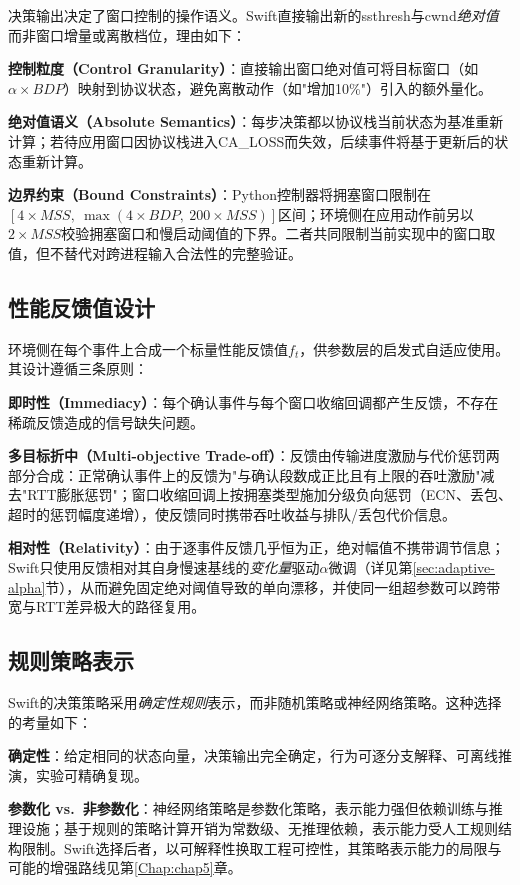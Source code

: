 决策输出决定了窗口控制的操作语义。Swift直接输出新的ssthresh与cwnd\emph{绝对值}而非窗口增量或离散档位，理由如下：

\textbf{控制粒度（Control Granularity）}：直接输出窗口绝对值可将目标窗口（如$\alpha \times BDP$）映射到协议状态，避免离散动作（如"增加10\%"）引入的额外量化。

\textbf{绝对值语义（Absolute Semantics）}：每步决策都以协议栈当前状态为基准重新计算；若待应用窗口因协议栈进入CA\_LOSS而失效，后续事件将基于更新后的状态重新计算。

\textbf{边界约束（Bound Constraints）}：Python控制器将拥塞窗口限制在$[4 \times MSS,\ \max(4 \times BDP,\ 200 \times MSS)]$区间；环境侧在应用动作前另以$2\times MSS$校验拥塞窗口和慢启动阈值的下界。二者共同限制当前实现中的窗口取值，但不替代对跨进程输入合法性的完整验证。

\subsection{性能反馈值设计}

环境侧在每个事件上合成一个标量性能反馈值$f_t$，供参数层的启发式自适应使用。其设计遵循三条原则：

\textbf{即时性（Immediacy）}：每个确认事件与每个窗口收缩回调都产生反馈，不存在稀疏反馈造成的信号缺失问题。

\textbf{多目标折中（Multi-objective Trade-off）}：反馈由传输进度激励与代价惩罚两部分合成：正常确认事件上的反馈为"与确认段数成正比且有上限的吞吐激励"减去"RTT膨胀惩罚"；窗口收缩回调上按拥塞类型施加分级负向惩罚（ECN、丢包、超时的惩罚幅度递增），使反馈同时携带吞吐收益与排队/丢包代价信息。

\textbf{相对性（Relativity）}：由于逐事件反馈几乎恒为正，绝对幅值不携带调节信息；Swift只使用反馈相对其自身慢速基线的\emph{变化量}驱动$\alpha$微调（详见第\ref{sec:adaptive-alpha}节），从而避免固定绝对阈值导致的单向漂移，并使同一组超参数可以跨带宽与RTT差异极大的路径复用。

\subsection{规则策略表示}

Swift的决策策略采用\emph{确定性规则}表示，而非随机策略或神经网络策略。这种选择的考量如下：

\textbf{确定性}：给定相同的状态向量，决策输出完全确定，行为可逐分支解释、可离线推演，实验可精确复现。

\textbf{参数化 vs.\ 非参数化}：神经网络策略是参数化策略，表示能力强但依赖训练与推理设施；基于规则的策略计算开销为常数级、无推理依赖，表示能力受人工规则结构限制。Swift选择后者，以可解释性换取工程可控性，其策略表示能力的局限与可能的增强路线见第\ref{Chap:chap5}章。


